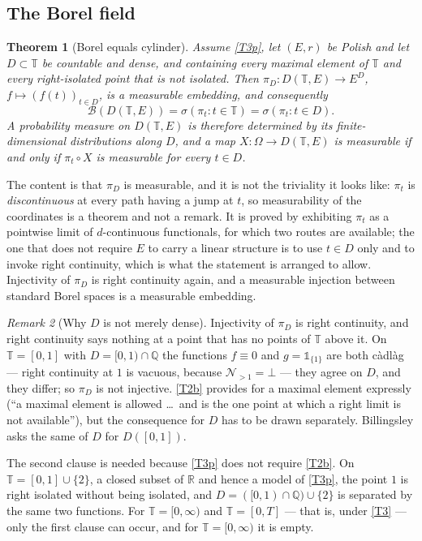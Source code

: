 \documentclass[11pt,a4paper]{article}
\theoremstyle{plain}
\newtheorem{theorem}{Theorem}[section]
\theoremstyle{definition}
\theoremstyle{remark}
\newtheorem{remark}[theorem]{Remark}
\newcommand{\R}{\mathbb{R}}
\newcommand{\Q}{\mathbb{Q}}
\newcommand{\T}{\mathbb{T}}                     %
\newcommand{\Bor}{\mathcal{B}}                 %
\newcommand{\DT}{D(\T,E)}
\begin{document}
\subsection{The Borel field}
\label{ssec:skorokhodborel}

\begin{theorem}[Borel equals cylinder]
  \label{thm:fdd}
  Assume \eqref{T3p}, let $(E,r)$ be Polish and let $D \subset \T$ be countable
  and dense, and \emph{containing every maximal element of $\T$ and every
  right-isolated point that is not isolated}.  Then $\pi_D : \DT \to E^D$,
  $f \mapsto (f(t))_{t \in D}$, is a measurable embedding, and consequently
  \[
    \Bor(\DT) = \sigma(\pi_t : t \in \T) = \sigma(\pi_t : t \in D).
  \]
  A probability measure on $\DT$ is therefore determined by its
  finite-dimensional distributions along $D$, and a map $X : \Omega \to \DT$ is
  measurable if and only if $\pi_t \circ X$ is measurable for every $t \in D$.
\end{theorem}

The content is that $\pi_D$ is measurable, and it is not the triviality it looks
like: $\pi_t$ is \emph{discontinuous} at every path having a jump at $t$, so
measurability of the coordinates is a theorem and not a remark.  It is proved by
exhibiting $\pi_t$ as a pointwise limit of $d$-continuous functionals, for which
two routes are available; the one that does not require $E$ to carry a linear
structure is to use $t \in D$ only and to invoke right continuity, which is what
the statement is arranged to allow.  Injectivity of $\pi_D$ is right continuity
again, and a measurable injection between standard Borel spaces is a measurable
embedding.

\begin{remark}[Why $D$ is not merely dense]
  \label{rem:fdddense}
  Injectivity of $\pi_D$ is right continuity, and right continuity says nothing
  at a point that has no points of $\T$ above it.  On $\T = [0,1]$ with
  $D = [0,1) \cap \Q$ the functions $f \equiv 0$ and $g = \mathbb 1_{\{1\}}$ are
  both c\`adl\`ag --- right continuity at $1$ is vacuous, because
  $\mathcal N_{>1} = \bot$ --- they agree on $D$, and they differ; so $\pi_D$ is
  not injective.  \eqref{T2b} provides for a maximal element expressly (``a
  maximal element is allowed \dots\ and is the one point at which a right limit
  is not available''), but the consequence for $D$ has to be drawn separately.
  Billingsley asks the same of $D$ for $D([0,1])$.

  The second clause is needed because \eqref{T3p} does not require \eqref{T2b}.
  On $\T = [0,1] \cup \{2\}$, a closed subset of $\R$ and hence a model of
  \eqref{T3p}, the point $1$ is right isolated without being isolated, and
  $D = ([0,1) \cap \Q) \cup \{2\}$ is separated by the same two functions.  For
  $\T = [0,\infty)$ and $\T = [0,T]$ --- that is, under \eqref{T3} --- only the
  first clause can occur, and for $\T = [0,\infty)$ it is empty.
\end{remark}
\end{document}
